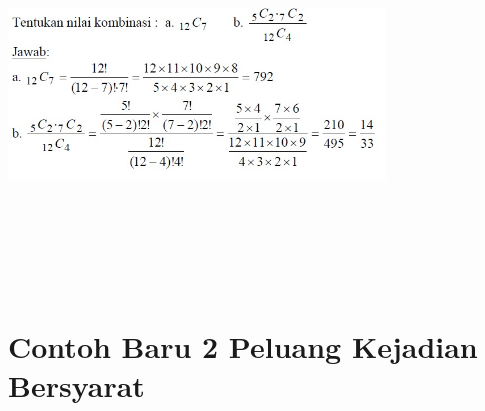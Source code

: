 \documentclass[11pt,fleqn]{book} %
\begin{document}
{{\includegraphics[width = 10cm, height= 10cm]{Pictures/muammar.jpg}



\section{Contoh Baru 2 Peluang Kejadian Bersyarat}

}}
\end{document}
